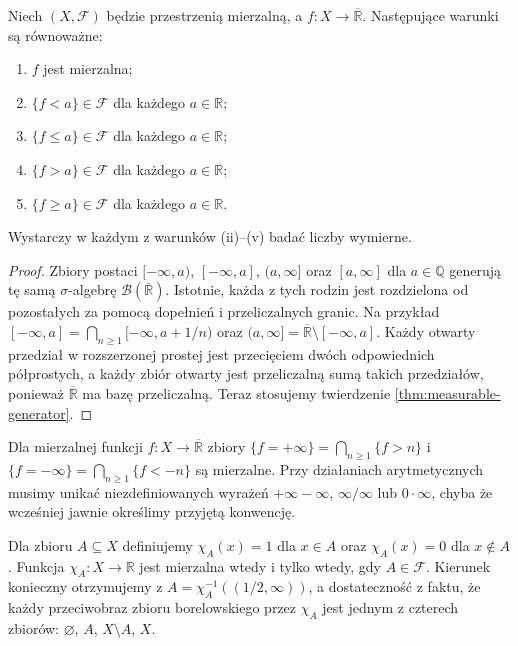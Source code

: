 \begin{twierdzenie}
\label{thm:extended-tests}
Niech $(X,\mathcal F)$ będzie przestrzenią mierzalną,
a $f:X\to\overline{\mathbb R}$. Następujące warunki są równoważne:
\begin{enumerate}[label=\textup{(\roman*)}]
\item $f$ jest mierzalna;
\item $\{f<a\}\in\mathcal F$ dla każdego $a\in\mathbb R$;
\item $\{f\le a\}\in\mathcal F$ dla każdego $a\in\mathbb R$;
\item $\{f>a\}\in\mathcal F$ dla każdego $a\in\mathbb R$;
\item $\{f\ge a\}\in\mathcal F$ dla każdego $a\in\mathbb R$.
\end{enumerate}
Wystarczy w każdym z warunków (ii)--(v) badać liczby wymierne.
\end{twierdzenie}
\begin{proof}
Zbiory postaci $[-\infty,a)$, $[-\infty,a]$,
$(a,\infty]$ oraz $[a,\infty]$ dla $a\in\mathbb Q$
generują tę samą $\sigma$-algebrę
$\mathcal B(\overline{\mathbb R})$. Istotnie, każda
z tych rodzin jest rozdzielona od pozostałych za pomocą
dopełnień i przeliczalnych granic. Na przykład
$[-\infty,a]=\bigcap_{n\ge1}[-\infty,a+1/n)$ oraz
$(a,\infty]=\overline{\mathbb R}\setminus[-\infty,a]$.
Każdy otwarty przedział w rozszerzonej prostej
jest przecięciem dwóch odpowiednich półprostych,
a każdy zbiór otwarty jest przeliczalną sumą takich
przedziałów, ponieważ $\overline{\mathbb R}$ ma bazę
przeliczalną. Teraz stosujemy twierdzenie
\ref{thm:measurable-generator}.
\end{proof}

\begin{uwaga}
Dla mierzalnej funkcji $f:X\to\overline{\mathbb R}$
zbiory $\{f=+\infty\}=\bigcap_{n\ge1}\{f>n\}$ i
$\{f=-\infty\}=\bigcap_{n\ge1}\{f<-n\}$ są mierzalne.
Przy działaniach arytmetycznych musimy unikać
niezdefiniowanych wyrażeń $+\infty-\infty$,
$\infty/\infty$ lub $0\cdot\infty$, chyba że wcześniej
jawnie określimy przyjętą konwencję.
\end{uwaga}

\begin{przyklad}
\label{ex:indicator-measurable}
Dla zbioru $A\subseteq X$ definiujemy
$\chi_A(x)=1$ dla $x\in A$ oraz
$\chi_A(x)=0$ dla $x\notin A$.
Funkcja $\chi_A:X\to\mathbb R$ jest mierzalna
wtedy i tylko wtedy, gdy $A\in\mathcal F$.
Kierunek konieczny otrzymujemy z
$A=\chi_A^{-1}((1/2,\infty))$, a dostateczność
z faktu, że każdy przeciwobraz zbioru borelowskiego
przez $\chi_A$ jest jednym z czterech zbiorów:
$\varnothing$, $A$, $X\setminus A$, $X$.
\end{przyklad}

